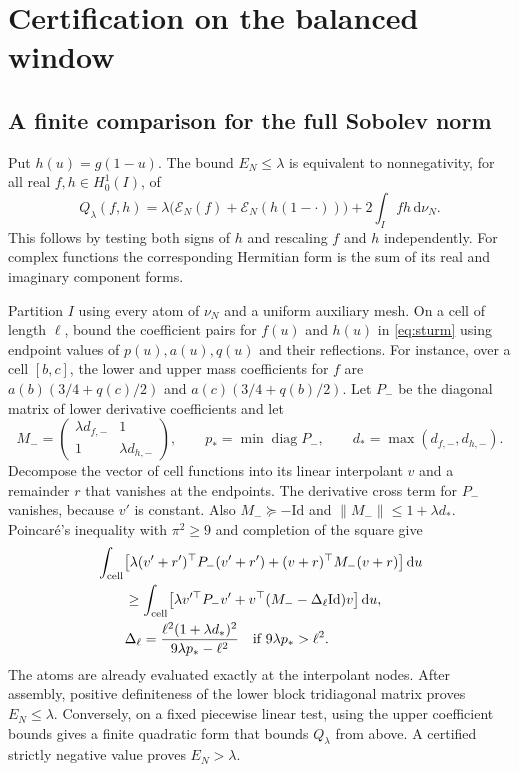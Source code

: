 \documentclass[11pt,a4paper]{article}
\numberwithin{equation}{section}
\newcommand{\ud}{\mathrm d}
\newcommand{\E}{\mathcal E_N}
\begin{document}
\section{Certification on the balanced window}
\label{sec:certificate}

\subsection{A finite comparison for the full Sobolev norm}

Put $h(u)=g(1-u)$. The bound $E_N\le\lambda$ is equivalent to
nonnegativity, for all real $f,h\in H^1_0(I)$, of
\begin{equation}
 Q_\lambda(f,h)=\lambda\bigl(\E(f)+\E(h(1-\cdot))\bigr)
       +2\int_I fh\,\ud\nu_N .
 \label{eq:Q}
\end{equation}
This follows by testing both signs of $h$ and rescaling $f$ and $h$
independently. For complex functions the corresponding Hermitian
form is the sum of its real and imaginary component forms.

Partition $I$ using every atom of $\nu_N$ and a uniform auxiliary
mesh. On a cell of length $\ell$, bound the coefficient pairs for
$f(u)$ and $h(u)$ in \cref{eq:sturm} using endpoint values of
$p(u),a(u),q(u)$ and their reflections. For instance, over a cell
$[b,c]$, the lower and upper mass coefficients for $f$ are
$a(b)(3/4+q(c)/2)$ and $a(c)(3/4+q(b)/2)$. Let $P_-$ be the diagonal
matrix of lower derivative coefficients and let
\[
 M_-=\begin{pmatrix}\lambda d_{f,-}&1\\1&\lambda d_{h,-}\end{pmatrix},
 \qquad
 p_*=\min\operatorname{diag}P_-,
 \qquad
 d_*=\max(d_{f,-},d_{h,-}).
\]
Decompose the vector of cell functions into its linear interpolant
$v$ and a remainder $r$ that vanishes at the endpoints. The derivative
cross term for $P_-$ vanishes, because $v'$ is constant. Also
$M_-\succeq-\mathrm{Id}$ and $\|M_-\|\le1+\lambda d_*$. Poincar\'e's
inequality with $\pi^2\ge9$ and completion of the square give
\begin{align}
 &\int_{\text{cell}}
       \bigl[\lambda (v'+r')^\top P_-(v'+r')
             +(v+r)^\top M_-(v+r)\bigr]\,\ud u
     \notag\\
 &\hspace{2em}\ge
     \int_{\text{cell}}\bigl[\lambda v'^\top P_-v'
                 +v^\top(M_--\Delta_\ell\mathrm{Id})v\bigr]\,\ud u,
     \label{eq:cell}\\
 &\hspace{2em}
    \Delta_\ell=
     \frac{\ell^2(1+\lambda d_*)^2}{9\lambda p_*-\ell^2}
     \quad\text{if }9\lambda p_*>\ell^2 .
     \notag
\end{align}
The atoms are already evaluated exactly at the interpolant nodes.
After assembly, positive definiteness of the lower block
tridiagonal matrix proves $E_N\le\lambda$. Conversely, on a fixed
piecewise linear test, using the upper coefficient bounds gives a
finite quadratic form that bounds $Q_\lambda$ from above. A certified
strictly negative value proves $E_N>\lambda$.
\end{document}
